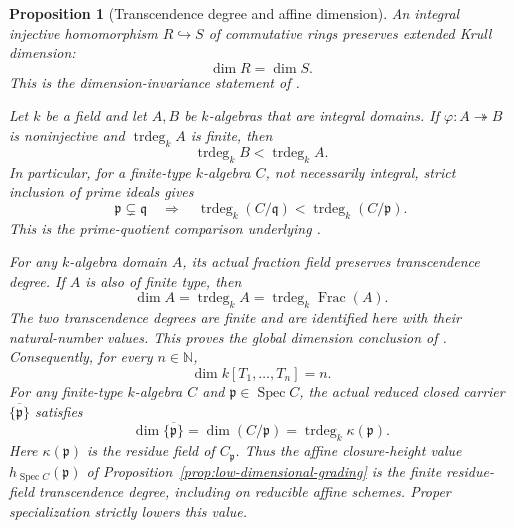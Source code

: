 \documentclass[11pt]{article}
\newtheorem{proposition}[theorem]{Proposition}
\theoremstyle{definition}
\theoremstyle{remark}
\DeclareMathOperator{\Spec}{Spec}
\begin{document}
\begin{proposition}[Transcendence degree and affine dimension]
\label{prop:affine-dimension}
An integral injective homomorphism \(R\hookrightarrow S\) of
commutative rings preserves extended Krull dimension:
\[
  \dim R=\dim S.
\]
This is the dimension-invariance statement of
\cite{StacksIntegralExtensionDimension}.

Let \(k\) be a field and let \(A,B\) be \(k\)-algebras that are
integral domains.
If \(\varphi:A\twoheadrightarrow B\) is noninjective and
\(\operatorname{trdeg}_k A\) is finite, then
\[
  \operatorname{trdeg}_k B<\operatorname{trdeg}_k A.
\]
In particular, for a finite-type \(k\)-algebra \(C\), not necessarily
integral, strict inclusion of prime ideals gives
\[
  \mathfrak p\subsetneq\mathfrak q
  \quad\Longrightarrow\quad
  \operatorname{trdeg}_k(C/\mathfrak q)
    <\operatorname{trdeg}_k(C/\mathfrak p).
\]
This is the prime-quotient comparison underlying
\cite{StacksPrimeQuotientTranscendenceDegree}.

For any \(k\)-algebra domain \(A\), its actual fraction field
preserves transcendence degree. If \(A\) is also of finite type, then
\[
  \dim A
    =\operatorname{trdeg}_k A
    =\operatorname{trdeg}_k\operatorname{Frac}(A).
\]
The two transcendence degrees are finite and are identified here with
their natural-number values. This proves the global dimension
conclusion of \cite{StacksAffineDimensionTranscendenceDegree}.
Consequently, for every \(n\in\mathbb N\),
\[
  \dim k[T_1,\ldots,T_n]=n.
\]
For any finite-type \(k\)-algebra \(C\) and
\(\mathfrak p\in\Spec C\), the actual reduced closed carrier
\(\overline{\{\mathfrak p\}}\) satisfies
\[
  \dim\overline{\{\mathfrak p\}}
    =\dim(C/\mathfrak p)
    =\operatorname{trdeg}_k\kappa(\mathfrak p).
\]
Here \(\kappa(\mathfrak p)\) is the residue field of
\(C_{\mathfrak p}\).
Thus the affine closure-height value \(h_{\Spec C}(\mathfrak p)\)
of Proposition~\ref{prop:low-dimensional-grading} is the finite
residue-field transcendence degree, including on reducible affine
schemes. Proper specialization strictly lowers this value.
\end{proposition}
\end{document}
